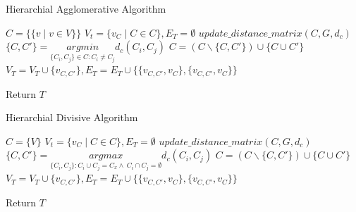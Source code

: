 \documentclass[a4paper]{article}
\begin{document}
  \begin{algorithm}
   \caption{Hierarchial Agglomerative Algorithm ~\cite{haa1}}
    \begin{algorithmic}[1]
     \State $C = \{\{v\mid v \in V\}\} $ 
     \State $V_t = \{v_C\mid C \in C\},E_T = \emptyset$ 
     \State $update\_distance\_matrix(C,G,d_c)$
     \State $\{C,C'\} =  \underset{\{C_i,C_j\} \in C : C_i \neq C_j}{argmin} d_c (C_i,C_j)$
     \State $C = (C \backslash \{C,C'\}) \cup \{C \cup C'\}$ 
     \State $V_T = V_T \cup \{v_{C,C'}\},E_T = E_T \cup \{\{v_{C,C'} ,v_{C}\},\{v_{C,C'} ,v_{C}\}\}$ 
     \EndWhile
    
      
        
       
       \State Return $T$



 

\end{algorithmic}
\end{algorithm}



  \begin{algorithm}
   \caption{Hierarchial Divisive Algorithm ~\cite{hda1}}
    \begin{algorithmic}[1]
     \State $C = \{ V\} $ 
     \State $V_t = \{v_C\mid C \in C\},E_T = \emptyset$ 
     \State $update\_distance\_matrix(C,G,d_c)$
     \State $\{C,C'\} =  \underset{\{C_i,C_j\}  : C_i \cup C_j = C_x   \wedge \  C_i \cap C_j = \emptyset}{argmax} d_c (C_i,C_j)$
     \State $C = (C \backslash \{C,C'\}) \cup \{C \cup C'\}$ 
     \State $V_T = V_T \cup \{v_{C,C'}\},E_T = E_T \cup \{\{v_{C,C'} ,v_{C}\},\{v_{C,C'} ,v_{C}\}\}$ 
     \EndWhile
    
      
        
       
       \State Return $T$



 

\end{algorithmic}
\end{algorithm}
\end{document}
